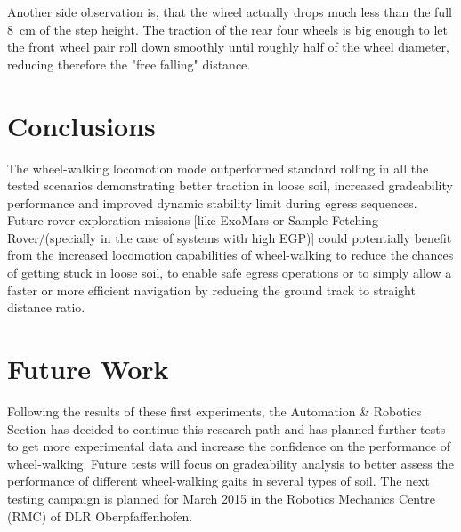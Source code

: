 \documentclass[a4paper,twocolumn]{esapub2005} %
\begin{document}
Another side observation is, that the wheel actually drops much less than the
full 8~\unit{cm} of the step height. The traction of the rear four wheels is big enough to
let the front wheel pair roll down smoothly until roughly half of the wheel
diameter, reducing therefore the "free falling" distance.


\section{Conclusions}
The wheel-walking locomotion mode outperformed standard rolling in all the
tested scenarios demonstrating better traction in loose soil, increased
gradeability performance and improved dynamic stability limit during egress sequences.
Future rover exploration missions [like ExoMars or Sample Fetching Rover/(specially in the case of systems with high EGP)] could
potentially benefit from the increased locomotion capabilities of wheel-walking
to reduce the chances of getting stuck in loose soil, to enable safe egress
operations or to simply allow a faster or more efficient navigation by reducing
the ground track to straight distance ratio.

\section{Future Work}
Following the results of these first experiments, the Automation \& Robotics Section has decided to
continue this research path and has planned further tests to get more
experimental data and increase the confidence on the performance of wheel-walking.  Future tests will focus on gradeability analysis to better assess the
performance of different wheel-walking gaits in several types of soil.  The
next testing campaign is planned for March 2015 in the Robotics Mechanics
Centre (RMC) of DLR Oberpfaffenhofen.


\vspace{-3 mm}




\end{document}
